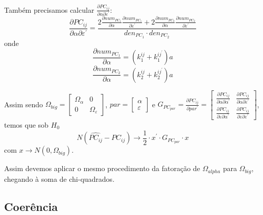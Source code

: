 \documentclass[a4paper,10pt]{article}
\begin{document}
Também precisamos calcular $\frac{\partial PC_{ij}}{\partial \alpha \partial \varepsilon^{'}}$:
\begin{equation}
\frac{\partial PC_{ij}}{\partial \alpha \partial \varepsilon^{'}} = \frac{2 \frac{\partial num_{PC_{1}}}{\partial \alpha} \frac{\partial num_{PC_{1}}}{\partial \varepsilon^{'}} + 2 \frac{\partial num_{PC_{2}}}{\partial \alpha} \frac{\partial num_{PC_{2}}}{\partial \varepsilon^{'}}}{den_{PC_{1}} \cdot den_{PC_{2}}}
\end{equation}
onde
\begin{equation}
\frac{\partial num_{PC_{1}}}{\partial \alpha} = (k_{1}^{ij} + k_{1}^{ij^{'}}) a
\end{equation}
\begin{equation}
\frac{\partial num_{PC_{2}}}{\partial \alpha} = (k_{2}^{ij} + k_{2}^{ij^{'}}) a
\end{equation}

Assim sendo $\Omega_{big} = \left[ \begin{array}{cc} 
 \Omega_{\alpha} & 0 \\ 0 & \Omega_{\varepsilon}
\end{array} \right]$, $par = \left[ \begin{array}{c} 
 \alpha \\ \varepsilon
\end{array} \right]$ e $G_{PC_{par}} = \frac{\partial PC_{ij}}{\partial par^{'}} = \left[ \begin{array}{cc} 
\frac{\partial PC_{ij}}{\partial \alpha \partial \alpha^{'}} & 
\frac{\partial PC_{ij}}{\partial \alpha \partial \varepsilon^{'}} \\ 
\frac{\partial PC_{ij}}{\partial \varepsilon \partial \alpha^{'}} & 
\frac{\partial PC_{ij}}{\partial \varepsilon \partial \varepsilon^{'}}
\end{array} \right]$, temos que sob $H_0$
\begin{equation}
N (\hat{PC_{ij}} - PC_{ij}) \to \frac{1}{2} \cdot x^{'} \cdot G_{PC_{par}} \cdot x
\end{equation}
com $x \to N(0, \Omega_{big})$.

Assim devemos aplicar o mesmo procedimento da fatoração de $\Omega_{alpha}$ para $\Omega_{big}$, chegando à soma de chi-quadrados.

\subsection{Coerência}
\end{document}
